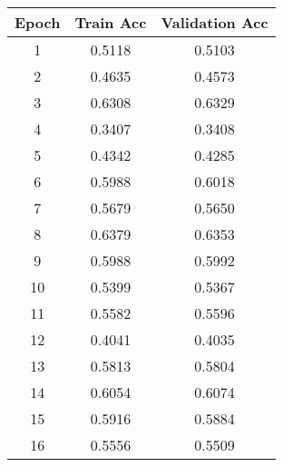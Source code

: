 \documentclass[12pt]{article}
\begin{document}
\begin{enumerate}[leftmargin=\labelsep]
\begin{enumerate}[label=\alph*)]
                    \begin{table}[H]
                        \centering
                        \begin{tabular}{|c|c|c|}
                            \hline
                            \textbf{Epoch} & \textbf{Train Acc} & \textbf{Validation Acc} \\ \hline
                            1              & 0.5118             & 0.5103                  \\ \hline
                            2              & 0.4635             & 0.4573                  \\ \hline
                            3              & 0.6308             & 0.6329                  \\ \hline
                            4              & 0.3407             & 0.3408                  \\ \hline
                            5              & 0.4342             & 0.4285                  \\ \hline
                            6              & 0.5988             & 0.6018                  \\ \hline
                            7              & 0.5679             & 0.5650                  \\ \hline
                            8              & 0.6379             & 0.6353                  \\ \hline
                            9              & 0.5988             & 0.5992                  \\ \hline
                            10             & 0.5399             & 0.5367                  \\ \hline
                            11             & 0.5582             & 0.5596                  \\ \hline
                            12             & 0.4041             & 0.4035                  \\ \hline
                            13             & 0.5813             & 0.5804                  \\ \hline
                            14             & 0.6054             & 0.6074                  \\ \hline
                            15             & 0.5916             & 0.5884                  \\ \hline
                            16             & 0.5556             & 0.5509                  \\ \hline

\end{tabular}
\end{table}
\end{enumerate}
\end{enumerate}
\end{document}
